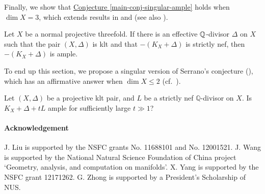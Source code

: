 



Finally, we show that {\hyperref[main-conj-singular-ample]{Conjecture \ref*{main-conj-singular-ample}}} holds when $\dim X=3$, which extends results in  \cite[Theorem 3.9]{Ser95} and \cite[Main Theorem]{Ueh00} (see also \cite[Conjecure 1.2]{HL20}).

\begin{mainthm}
\label{mainthm-ample-3klt}
Let $X$ be a normal projective threefold. If there is an effective $\mathbb Q$-divisor $\Delta$ on $X$ such that the pair $(X,\Delta)$ is klt and that $-(K_X+\Delta)$ is strictly nef, then $-(K_X+\Delta)$ is ample.
\end{mainthm}



\noindent 
To  end up this section, we propose a singular version of Serrano's conjecture (\cite{Ser95}), which has an affirmative answer when $\dim X\leqslant 2$ (cf.~\cite[Corollary 1.8]{HL20}). 
\begin{ques}\label{main-conj-singular-arbitrary}
Let $(X,\Delta)$ be a projective klt pair, and $L$ be a strictly nef $\mathbb{Q}$-divisor on $X$.
Is $K_X+\Delta+tL$  ample for sufficiently large $t\gg 1$?
\end{ques}



\paragraph{\textbf{Acknowledgement}}
J. Liu is supported by the NSFC grants No. 11688101 and No. 12001521. 
J. Wang is supported by the National Natural Science Foundation of China project `Geometry, analysis, and computation on manifolds'.
X. Yang is supported by the NSFC grant 12171262.
G. Zhong is supported by a President's Scholarship of NUS.


\baselineskip









